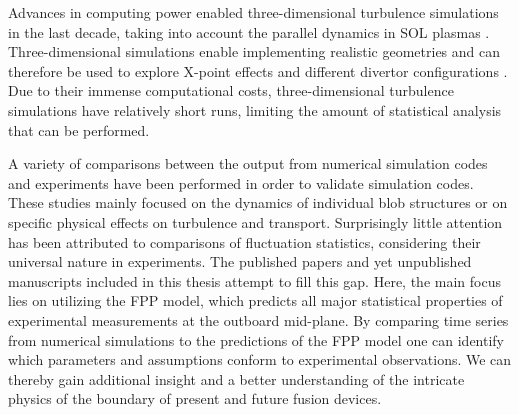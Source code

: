 Advances in computing power enabled three-dimensional turbulence simulations in the last decade, taking into account the parallel dynamics in SOL plasmas \cite{naulin2005shear,ricci2012simulation,tamain20143d,easy2016investigation,dudson2017hermes,stegmeir2018grillix,Nicholas2021comparing}. Three-dimensional simulations enable implementing realistic geometries and can therefore be used to explore X-point effects and different divertor configurations \cite{nespoli20193d,riva2019three}. Due to their immense computational costs, three-dimensional turbulence simulations have relatively short runs, limiting the amount of statistical analysis that can be performed. 

A variety of comparisons between the output from numerical simulation codes and experiments have been performed in order to validate simulation codes. These studies mainly focused on the dynamics of individual blob
structures or on specific physical effects on turbulence and transport. Surprisingly little attention has been attributed to comparisons of fluctuation statistics, considering their universal nature in experiments. The published papers and yet unpublished manuscripts included in this thesis attempt to fill this gap. Here, the main focus lies on utilizing the FPP model, which predicts all major statistical properties of experimental measurements at the outboard mid-plane. By comparing time series from numerical simulations to the predictions of the FPP model one can identify which parameters and assumptions conform to experimental observations. We can thereby gain additional insight and a better understanding of the intricate physics of the boundary of present and future fusion devices.


